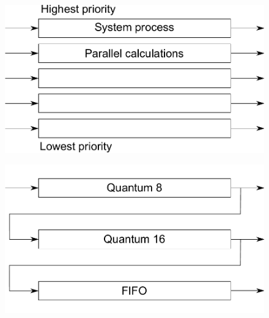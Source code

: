 \begin{frame}{\sectitle}
    \begin{figure}
        \includegraphics[width=\textwidth]{images/multipleFiles.pdf}
    \end{figure}
\end{frame}


\begin{frame}{\sectitle}
    \begin{figure}
        \includegraphics[width=\textwidth]{images/multipleFilesQt.pdf}
    \end{figure}
\end{frame}




